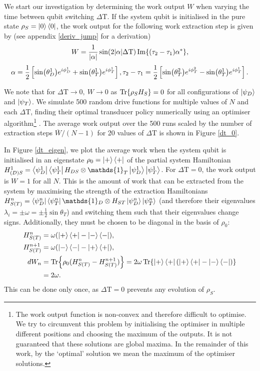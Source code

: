 We start our investigation by determining the work output $W$ when varying the time between qubit switching $\Delta \mathrm{T}$.
If the system qubit is initialised in the pure state $\rho_S = \ket{0} \bra{0}$, the work output for the following work extraction step is given by (see appendix \ref{deriv_jump} for a derivation)
\begin{equation} \label{single_work}
	W = \frac{1}{\abs{\alpha}} \sin(2\abs{\alpha}\Delta \mathrm{T}) \Im{(\tau_2 - \tau_1) \alpha^*},
\end{equation}
\begin{equation*}
	\alpha = \frac{1}{2} \left[\sin(\theta_D^1) e^{i\phi_D^1} + \sin(\theta_T^1) e^{i\phi_T^1}\right], \\
	\tau_2 - \tau_1 = \frac{1}{2} \left[ \sin(\theta_T^2)e^{i\phi_T^2} - \sin(\theta_T^1)e^{i\phi_T^1} \right].
\end{equation*}

We note that for $\Delta \mathrm{T} \to 0, \ W \to 0$ as $\Tr{\rho_S H_S} = 0$ for all configurations of $\ket{\psi_D}$ and $ \ket{\psi_T}$.
We simulate 500 random drive functions for multiple values of $N$ and each $\Delta \mathrm{T}$, finding their optimal transducer policy numerically using an optimiser algorithm\footnote{The work output function is non-convex and therefore difficult to optimise. We try to circumvent this problem by initialising the optimiser in multiple different positions and choosing the maximum of the outputs. It is not guaranteed that these solutions are global maxima. In the remainder of this work, by the `optimal' solution we mean the maximum of the optimiser solutions.} \cite{2020SciPy-NMeth}. The average work output over the 500 runs scaled by the number of extraction steps $\overline{W}/(N-1)$ for 20 values of $\Delta \mathrm{T}$ is shown in Figure \ref{dt_0}.

In Figure \ref{dt_eigen}, we plot the average work when the system qubit is initialised in an eigenstate $\rho_0 = \ket{+}\bra{+}$ of the partial system Hamiltonian $H^1_{(D)S} = \bra{\psi_D^1} \bra{\psi_T^{1}} H_{DS} \otimes \mathds{1}_T \ket{\psi_D^1} \ket{\psi_T^1}$.
For $\Delta \mathrm{T} = 0$, the work output is $W = 1$ for all $N$.
This is the amount of work that can be extracted from the system by maximising the strength of the extraction Hamiltonians \mbox{$H^n_{S(T)}=\bra{\psi_D^n}\bra{\psi_T^{n}}\mathds{1}_D \otimes H_{ST} \ket{\psi_D^n}\ket{\psi_T^n}$} (and therefore their eigenvalues $\lambda_i = \pm \omega = \pm \frac{1}{2} \sin \theta_T$) and switching them such that their eigenvalues change signs. Additionally, they must be chosen to be diagonal in the basis of $\rho_0$:
\begin{align*}
	H_{S(T)}^n &= \omega (\ket{+}\bra{+} - \ket{-}\bra{-}), \\
	H_{S(T)}^{n+1} &= \omega (\ket{-}\bra{-} - \ket{+}\bra{+}), \\
	dW_n &= \Tr{\rho_0 (H_{S(T)}^n - H_{S(T)}^{n+1})} = 2 \omega \Tr{\ket{+}\bra{+} (\ket{+}\bra{+} - \ket{-}\bra{-}) } \\
	&= 2 \omega.
\end{align*}
This can be done only once, as $\Delta \mathrm{T} = 0$ prevents any evolution of $\rho_S$.

